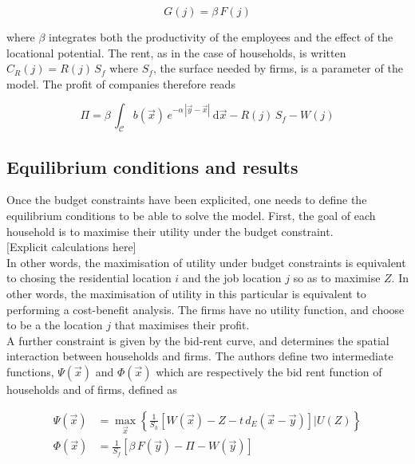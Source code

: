 \begin{equation}
    G(j) = \beta\,F(j)
\end{equation}

where $\beta$ integrates both the productivity of the employees and the effect
of the locational potential. The rent, as
in the case of households, is written $C_R(j) = R(j)\,S_f$ where $S_f$, the
surface needed by firms, is a parameter of the model. The profit
of companies therefore reads

\begin{equation}
    \Pi = \beta\, \int_{\mathcal{C}} b(\vec{x})\,e^{-\alpha\,\left|\vec{y}-\vec{x}\right|}\:\mathrm{d}\vec{x}
        - R\left(j\right)\,S_f
        - W\left(j\right)
\end{equation}


\subsection{Equilibrium conditions and results}
\label{sub:equilibrium_conditions}

Once the budget constraints have been explicited, one needs to define
the equilibrium conditions to be able to solve the model. First, the goal of
each household is to maximise their utility under the budget constraint.\\

[Explicit calculations here]\\

In other words, the maximisation of utility under budget constraints is
equivalent to chosing the residential location $i$ and the job location $j$ so
as to maximise $Z$. In other words, the maximisation of utility in this
particular is equivalent to performing a cost-benefit analysis. The firms have
no utility function, and choose to be a the location $j$ that maximises their
profit.\\

A further constraint is given by the bid-rent curve, and determines the spatial
interaction between households and firms. The authors define two intermediate
functions, $\Psi(\vec{x})$ and $\Phi(\vec{x})$ which are respectively the bid
rent function of households and of firms, defined as

\begin{align}
    \Psi\left(\vec{x}\right) &= \max_{\vec{x}} \left\{ \frac{1}{S_h} \left[W(\vec{x} ) - Z -
    t\,d_E\left(\vec{x}-\vec{y}\right)\right] | U(Z)\right\}\\
    \Phi\left(\vec{x}\right) &= \frac{1}{S_f} \left[\beta\,F(\vec{y}) - \Pi -
W(\vec{y})\right]
\end{align}

